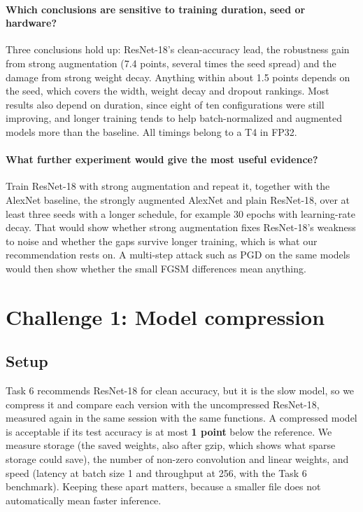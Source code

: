 \documentclass[11pt,a4paper]{article}
\begin{document}
\paragraph{Which conclusions are sensitive to training duration, seed or hardware?}
Three conclusions hold up: ResNet-18's clean-accuracy lead, the robustness gain from strong augmentation (7.4 points, several times the seed spread) and the damage from strong weight decay. Anything within about 1.5 points depends on the seed, which covers the width, weight decay and dropout rankings. Most results also depend on duration, since eight of ten configurations were still improving, and longer training tends to help batch-normalized and augmented models more than the baseline. All timings belong to a T4 in FP32.

\paragraph{What further experiment would give the most useful evidence?}
Train ResNet-18 with strong augmentation and repeat it, together with the AlexNet baseline, the strongly augmented AlexNet and plain ResNet-18, over at least three seeds with a longer schedule, for example 30 epochs with learning-rate decay. That would show whether strong augmentation fixes ResNet-18's weakness to noise and whether the gaps survive longer training, which is what our recommendation rests on. A multi-step attack such as PGD on the same models would then show whether the small FGSM differences mean anything.

\section{Challenge 1: Model compression}

\subsection{Setup}
Task 6 recommends ResNet-18 for clean accuracy, but it is the slow model, so we compress it and compare each version with the uncompressed ResNet-18, measured again in the same session with the same functions. A compressed model is acceptable if its test accuracy is at most \textbf{1 point} below the reference. We measure storage (the saved weights, also after gzip, which shows what sparse storage could save), the number of non-zero convolution and linear weights, and speed (latency at batch size 1 and throughput at 256, with the Task 6 benchmark). Keeping these apart matters, because a smaller file does not automatically mean faster inference.
\end{document}
